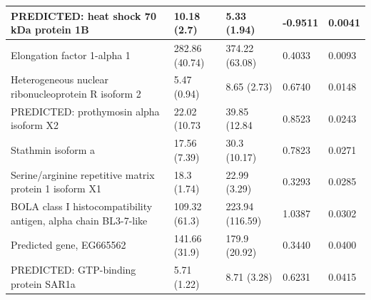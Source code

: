 \documentclass[../main.tex]{subfiles}
\begin{document}
\begin{flushleft}
\begin{landscape}
\begin{table}
\begin{tabular}{|l|l|l|l|l|}
        \hline
        PREDICTED: heat shock 70 kDa protein 1B                                & 10.18 (2.7)                           & 5.33 (1.94)                            & -0.9511                                                & 0.0041                                                  \\
        \hline
        Elongation factor 1-alpha 1                                            & 282.86 (40.74)                        & 374.22 (63.08)                         & 0.4033                                                 & 0.0093                                                  \\
        \hline
        Heterogeneous nuclear ribonucleoprotein R isoform 2                    & 5.47 (0.94)                           & 8.65 (2.73)                            & 0.6740                                                 & 0.0148                                                  \\
        \hline
        PREDICTED: prothymosin alpha isoform X2                                & 22.02 (10.73                          & 39.85 (12.84                           & 0.8523                                                 & 0.0243                                                  \\
        \hline
        Stathmin isoform a                                                     & 17.56 (7.39)                          & 30.3 (10.17)                           & 0.7823                                                 & 0.0271                                                  \\
        \hline
        Serine/arginine repetitive matrix protein 1 isoform X1                 & 18.3 (1.74)                           & 22.99 (3.29)                           & 0.3293                                                 & 0.0285                                                  \\
        \hline
        BOLA class I histocompatibility antigen, alpha chain BL3-7-like        & 109.32 (61.3)                         & 223.94 (116.59)                        & 1.0387                                                 & 0.0302                                                  \\
        \hline
        Predicted gene, EG665562                                               & 141.66 (31.9)                         & 179.9 (20.92)                          & 0.3440                                                 & 0.0400                                                  \\
        \hline
        PREDICTED: GTP-binding protein SAR1a                                   & 5.71 (1.22)                           & 8.71 (3.28)                            & 0.6231                                                 & 0.0415                                                  \\
        \hline
        \end{tabular}
        \end{table}
\end{landscape}


\end{flushleft}
\end{document}
